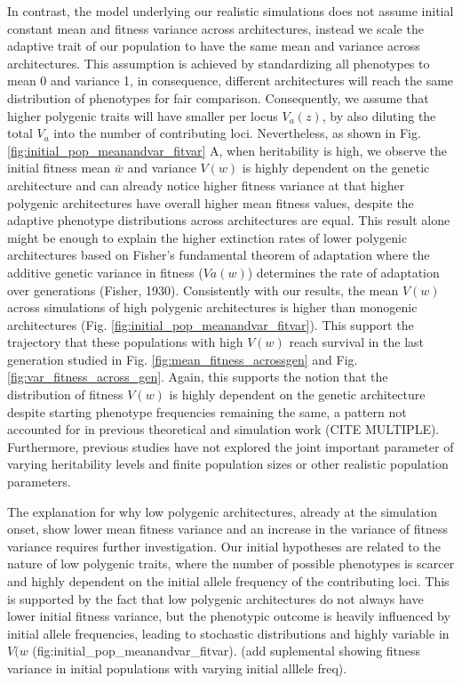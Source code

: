 \documentclass{article}
\begin{document}
In contrast, the model underlying our realistic simulations does not assume initial constant mean and fitness variance across architectures, instead we scale the adaptive trait of our population to have the same mean and variance across architectures. This assumption is achieved by standardizing all phenotypes to mean 0 and variance 1, in consequence, different architectures will reach the same distribution of phenotypes for fair comparison. Consequently, we assume that higher polygenic traits will have smaller per locus $V_a(z)$, by also diluting the total $V_a$ into the number of contributing loci. Nevertheless, as shown in Fig. \ref{fig:initial_pop_meanandvar_fitvar} A, when heritability is high, we observe the initial fitness mean $\bar{w}$ and variance $V(w)$ is highly dependent on the genetic architecture and can already notice higher fitness variance at that higher polygenic architectures have overall higher mean fitness values, despite the adaptive phenotype distributions across architectures are equal. This result alone might be enough to explain the higher extinction rates of lower polygenic architectures based on Fisher's fundamental theorem of adaptation where the additive genetic variance in fitness ($Va(w)$) determines the rate of adaptation over generations (Fisher, 1930). Consistently with our results, the mean  $V(w)$ across simulations of high polygenic architectures is higher than monogenic architectures (Fig. \ref{fig:initial_pop_meanandvar_fitvar}). This support the trajectory that these populations with high $V(w)$  reach survival in the last generation studied in Fig. \ref{fig:mean_fitness_acrossgen} and Fig. \ref{fig:var_fitness_across_gen}. Again, this supports the notion that the distribution of fitness $V(w)$  is highly dependent on the genetic architecture despite starting phenotype frequencies remaining the same, a pattern not accounted for in previous theoretical and simulation work (CITE MULTIPLE). Furthermore, previous studies have not explored the joint important parameter of varying heritability levels and finite population sizes or other realistic population parameters.   

The explanation for why low polygenic architectures, already at the simulation onset, show lower mean fitness variance and an increase in the variance of fitness variance requires further investigation. Our initial hypotheses are related to the nature of low polygenic traits, where the number of possible phenotypes is scarcer and highly dependent on the initial allele frequency of the contributing loci. This is supported by the fact that low polygenic architectures do not always have lower initial fitness variance, but the phenotypic outcome is heavily influenced by initial allele frequencies, leading to stochastic distributions and highly variable in $V(w$ (fig:initial_pop_meanandvar_fitvar). (add suplemental showing fitness variance in initial populations with varying initial alllele freq).
\end{document}
